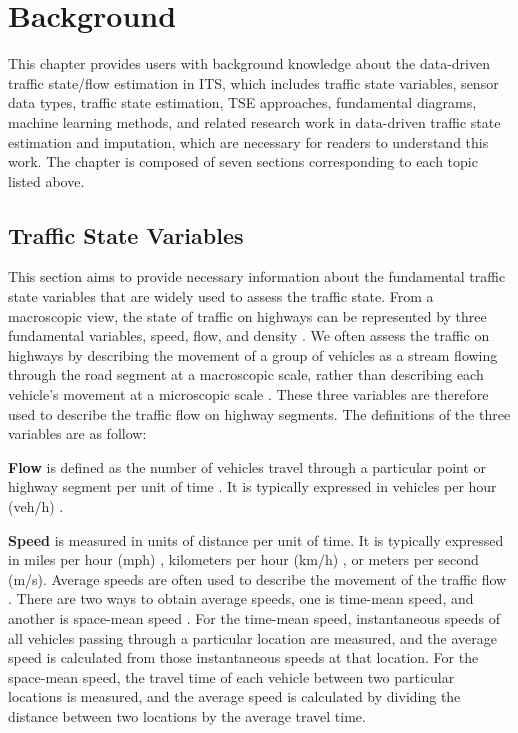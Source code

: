 \documentclass[english]{kththesis}
\begin{document}
\cleardoublepage
\chapter{Background}
\label{ch:background}
This chapter provides users with background knowledge about the data-driven traffic state/flow estimation in ITS, which includes traffic state variables, sensor data types, traffic state estimation, TSE approaches, fundamental diagrams, machine learning methods, and related research work in data-driven traffic state estimation and imputation, which are necessary for readers to understand this work. The chapter is composed of seven sections corresponding to each topic listed above.

\section{Traffic State Variables}
This section aims to provide necessary information about the fundamental traffic state variables that are widely used to assess the traffic state. From a macroscopic view, the state of traffic on highways can be represented by three fundamental variables, speed, flow, and density \cite{seo_tse, elefteriadou_traffic_flow_theory}. We often assess the traffic on highways by describing the movement of a group of vehicles as a stream flowing through the road segment at a macroscopic scale, rather than describing each vehicle's movement at a microscopic scale \cite{elefteriadou_traffic_flow_theory}. These three variables are therefore used to describe the traffic flow on highway segments. The definitions of the three variables are as follow:

\textbf{Flow} is defined as the number of vehicles travel through a particular point or highway segment per unit of time \cite{elefteriadou_traffic_flow_theory}. It is typically expressed in vehicles per hour (veh/h) \cite{seo_tse, elefteriadou_traffic_flow_theory}.

\textbf{Speed} is measured in units of distance per unit of time. It is typically expressed in miles per hour (mph) \cite{elefteriadou_traffic_flow_theory}, kilometers per hour (km/h) \cite{seo_tse}, or meters per second (m/s). Average speeds are often used to describe the movement of the traffic flow \cite{seo_tse, elefteriadou_traffic_flow_theory}. There are two ways to obtain average speeds, one is time-mean speed, and another is space-mean speed \cite{elefteriadou_traffic_flow_theory}. For the time-mean speed, instantaneous speeds of all vehicles passing through a particular location are measured, and the average speed is calculated from those instantaneous speeds at that location. For the space-mean speed, the travel time of each vehicle between two particular locations is measured, and the average speed is calculated by dividing the distance between two locations by the average travel time.
\end{document}
